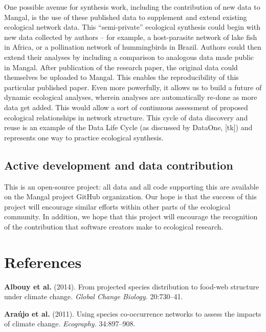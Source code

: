 One possible avenue for synthesis work, including the contribution of
new data to Mangal, is the use of these published data to supplement and
extend existing ecological network data. This ``semi-private''
ecological synthesis could begin with new data collected by authors --
for example, a host-parasite network of lake fish in Africa, or a
pollination network of hummingbirds in Brazil. Authors could then extend
their analyses by including a comparison to analogous data made public
in Mangal. After publication of the research paper, the original data
could themselves be uploaded to Mangal. This enables the reproducibility
of this particular published paper. Even more powerfully, it allows us
to build a future of dynamic ecological analyses, wherein analyses are
automatically re-done as more data get added. This would allow a sort of
continuous assessment of proposed ecological relationships in network
structure. This cycle of data discovery and reuse is an example of the
Data Life Cycle (as discussed by DataOne, {[}tk{]}) and represents one
way to practice ecological synthesis.

\hypertarget{active-development-and-data-contribution}{%
\subsection{Active development and data
contribution}\label{active-development-and-data-contribution}}

This is an open-source project: all data and all code supporting this
are available on the Mangal project GitHub organization. Our hope is
that the success of this project will encourage similar efforts within
other parts of the ecological community. In addition, we hope that this
project will encourage the recognition of the contribution that software
creators make to ecological research.

\hypertarget{references}{%
\section*{References}\label{references}}

\hypertarget{refs}{}
\leavevmode\hypertarget{ref-AlboVele14}{}%
\textbf{Albouy et al.} (2014). From projected species distribution to
food-web structure under climate change. \emph{Global Change Biology.}
20:730--41.

\leavevmode\hypertarget{ref-ArauRoze11}{}%
\textbf{Araújo et al.} (2011). Using species co-occurrence networks to
assess the impacts of climate change. \emph{Ecography.} 34:897--908.


